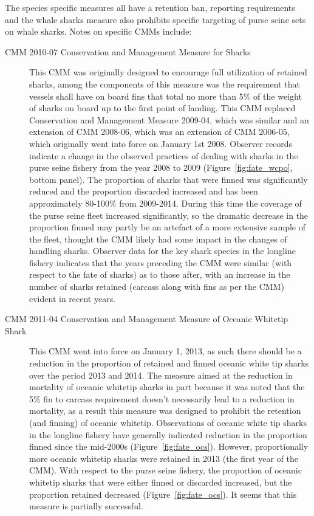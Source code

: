 \documentclass[12pt]{SCreport}
\begin{document}
The species specific measures all have a retention ban, reporting requirements and the whale sharks measure also prohibits specific targeting of purse seine sets on whale sharks. Notes on specific CMMs include:
\begin{description}
 \item[CMM 2010-07 Conservation and Management Measure for Sharks] This CMM was originally designed to encourage full utilization of retained sharks, among the components of this measure was the requirement that vessels shall have on board fins that total no more than 5\% of the weight of sharks on board up to the first point of landing. This CMM replaced Conservation and Management Measure 2009-04, which was similar and an extension of CMM 2008-06, which was an extension of CMM 2006-05, which originally went into force on January 1st 2008. Observer records indicate a change in the observed practices of dealing with sharks in the purse seine fishery from the year 2008 to 2009 (Figure~\ref{fig:fate_wcpo}, bottom panel). 
The proportion of sharks that were finned was significantly reduced and the proportion discarded increased and has been approximately 80-100\% from 2009-2014. During this time the coverage of the purse seine fleet increased significantly, so the dramatic decrease in the proportion finned may partly be an artefact of a more extensive sample of the fleet, thought the CMM likely had some impact in the changes of handling sharks. Observer data for the key shark species in the longline fishery indicates that the years preceding the CMM were similar (with respect to the fate of sharks) as to those after, with an increase in the number of sharks retained (carcass along with fins as per the CMM) evident in recent years.
 
 
 \item[CMM 2011-04 Conservation and Management Measure of Oceanic Whitetip Shark] This CMM went into force on January 1, 2013, as such there should be a reduction in the proportion of retained and finned oceanic white tip sharks over the period 2013 and 2014. The measure aimed at the reduction in mortality of oceanic whitetip sharks in part because it was noted that the 5\% fin to carcass requirement doesn't necessarily lead to a reduction in mortality, as a result this measure was designed to prohibit the retention (and finning) of oceanic whitetip. Observations of oceanic white tip sharks in the longline fishery have generally indicated reduction in the proportion finned since the mid-2000s (Figure~\ref{fig:fate_ocs}). However, proportionally more oceanic whitetip sharks were retained in 2013 (the first year of the CMM). With respect to the purse seine fishery, the proportion of oceanic whitetip sharks that were either finned or discarded increased, but the proportion retained decreased  (Figure~\ref{fig:fate_ocs}).  It seems that this measure is partially successful.



\end{description}
\end{document}
